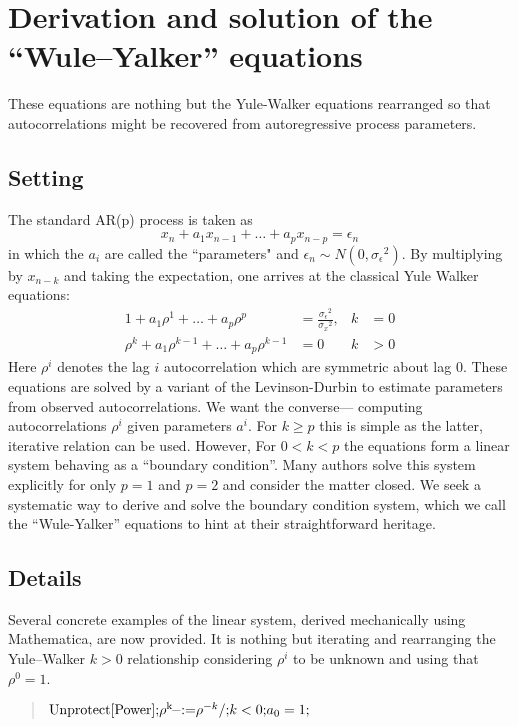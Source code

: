 \documentclass[12pt,letterpaper]{article}
\begin{document}
\section*{Derivation and solution of the ``Wule--Yalker'' equations}

These equations are nothing but the Yule-Walker equations rearranged so that
autocorrelations might be recovered from autoregressive process parameters.

\subsection*{Setting}

The standard AR(p) process is taken as
\[
x_n+a_1x_{n-1}+\dots+a_px_{n-p}=\epsilon _n
\]
in which the \(a_i\) are called the ``parameters" and \(\epsilon _n\sim
N\left(0,\sigma _{\epsilon }{}^2\right)\). By multiplying by \(x_{n-k}\) and
taking the expectation, one arrives at the classical Yule Walker equations:
\begin{align*}
1+a_1\rho ^1+\dots+a_p\rho ^p &= \frac{\sigma _{\epsilon }{}^2}{\sigma _x{}^2},
&
k&=0
\\
\rho ^k+a_1\rho ^{k-1}+\dots+a_p\rho ^{k-1}&=0
&
k &> 0
\end{align*}
Here $\rho^i$ denotes the lag $i$ autocorrelation which are symmetric about lag
$0$. These equations are solved by a variant of the Levinson-Durbin to estimate
parameters from observed autocorrelations. We want the converse--- computing
autocorrelations $\rho^i$ given parameters $a^i$.  For $k\geq p$ this is simple
as the latter, iterative relation can be used. However, For $0<k<p$ the
equations form a linear system behaving as a ``boundary condition''.  Many
authors solve this system explicitly for only $p=1$ and $p=2$ and consider the
matter closed.  We seek a systematic way to derive and solve the boundary
condition system, which we call the ``Wule-Yalker'' equations to hint at their
straightforward heritage.

\subsection*{Details}

Several concrete examples of the linear system, derived mechanically using
Mathematica, are now provided. It is nothing but iterating and rearranging the
Yule--Walker $k>0$ relationship considering $\rho ^i$ to be unknown and using
that $\rho^0=1$.

\begin{quote}
\noindent\({\text{Unprotect}[\text{Power}];}\\
{\rho ^{\text{k$\_$}}\text{:=}\rho ^{-k}\text{/;}k<0;}\\
{a_0=1;}\)
\end{quote}
\end{document}
